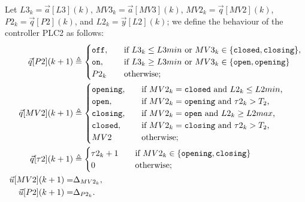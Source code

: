 {Let $L3_k=\vec{a}[L3](k)$, $MV3_k=\vec{a}[MV3](k)$, $MV2_k=\vec{q}[MV2](k)$, $P2_k=\vec{q}[P2](k)$, and $L2_k=\vec{y}[L2](k)$; we define the behaviour of the controller PLC2 as follows:
\begin{align}
\vec{q}[P2](k+1)&\triangleq
    \begin{cases}
      \texttt{off},&\quad \text{if $L3_k\leq L3min$ or $MV3_k\in \set{\texttt{closed},\texttt{closing}}$},\\
      \texttt{on},&\quad \text{if $L3_k \geq L3min$ or $MV3_k\in \set{\texttt{open},\texttt{opening}}$}\\
      P2_k&\quad \text{otherwise;}
    \end{cases}\\
\vec{q}[MV2](k+1)&\triangleq
  \begin{cases}
    \texttt{opening},&\quad \text{if $MV2_k=\texttt{closed}$ and $L2_k\leq L2min$,}\\
    \texttt{open},&\quad \text{if $MV2_k=\texttt{opening}$ and $\tau2_k>T_2$,}\\
    \texttt{closing},&\quad \text{if $MV2_k=\texttt{open}$ and $L2_k\geq L2max$,}\\
    \texttt{closed},&\quad \text{if $MV2_k=\texttt{closing}$ and $\tau2_k>T_2$,}\\
    MV2&\quad \text{otherwise;}    
  \end{cases}\\
\vec{q}[\tau2](k+1)&\triangleq
\begin{cases}
  \tau2_k+1 &\quad \text{if $MV2_k\in \set{\texttt{opening},\texttt{closing}}$}\\
  0&\quad \text{otherwise;}    
\end{cases}\\
\vec{u}[MV2](k+1)=&\const_{MV2_k},\\%
\vec{u}[P2](k+1)=&\const_{P2_k}.%
\end{align}
}
